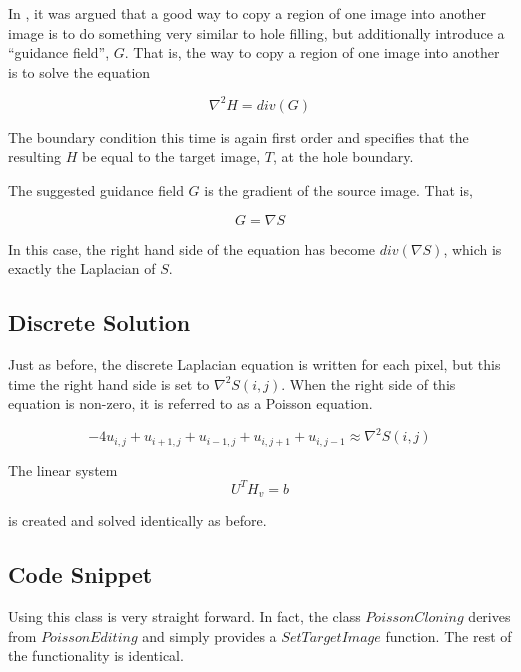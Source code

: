 \documentclass{InsightArticle}
\begin{document}
In \cite{PoissonImageEditing}, it was argued that a good way to copy a region of one image into another image is to do something very similar to hole filling, but additionally introduce a ``guidance field'', $G$. That is, the way to copy a region of one image into another is to solve the equation

\begin{equation}
\nabla^2 H = div(G)
\end{equation}

The boundary condition this time is again first order and specifies that the resulting $H$ be equal to the target image, $T$, at the hole boundary.

The suggested guidance field $G$ is the gradient of the source image. That is,

\begin{equation}
G = \nabla S
\end{equation}

In this case, the right hand side of the equation has become $div(\nabla S)$, which is exactly the Laplacian of $S$.

\subsection{Discrete Solution}
Just as before, the discrete Laplacian equation is written for each pixel, but this time the right hand side is set to $\nabla^2 S(i,j)$. When the right side of this equation is non-zero, it is referred to as a Poisson equation.

\begin{equation}
\label{eqn:DiscretePoisson}
-4 u_{i,j} + u_{i+1,j} + u_{i-1,j} + u_{i,j+1} + u_{i,j-1} \approx \nabla^2 S(i,j)
\end{equation}

The linear system 
\begin{equation}
 U^T H_v = b
\end{equation}

is created and solved identically as before.

\subsection{Code Snippet}

Using this class is very straight forward. In fact, the class $PoissonCloning$ derives from $PoissonEditing$ and simply provides a $SetTargetImage$ function. The rest of the functionality is identical.
\end{document}
